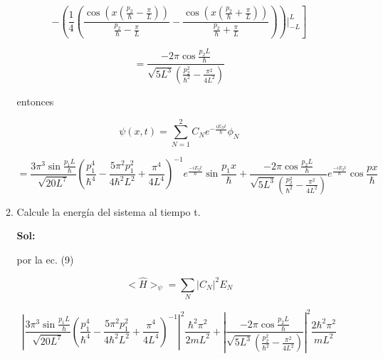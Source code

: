 \documentclass[12pt,a4paper]{article}
\begin{document}
\begin{enumerate}
\begin{enumerate}
        \begin{equation*}
            \left.- \left(\frac{1}{4} (\frac{\cos{(x(\frac{p_2}{\hbar}  - \frac{\pi}{L}) )}}{\frac{p_2}{\hbar}  - \frac{\pi}{L}} - \frac{\cos{(x(\frac{p_2}{\hbar}  + \frac{\pi}{L}))}}{\frac{p_2}{\hbar}  + \frac{\pi}{L}}) \right)|_{-L}^{L}\right]
        \end{equation*}
        
        \begin{equation*}
            =\frac{-2\pi\cos{\frac{p_2 L}{\hbar}}}{\sqrt{5L^3} \left(\frac{p_2^2}{\hbar^2} - \frac{\pi^2}{4L^2}\right)}
        \end{equation*}
        
        
        entonces
        
        \begin{equation*}
            \psi (x,t) = \sum_{N=1}^{2} C_N  e^{-\frac{iE_N t}{\hbar}} \phi_N 
        \end{equation*}
        
        \begin{equation*}
            = \frac{3 \pi^3 \sin{\frac{p_1 L}{\hbar}}}{\sqrt{20L^7}} (\frac{p_1^4}{\hbar^4} - \frac{5 \pi^2 p_1^2}{4 \hbar^2 L^2} + \frac{\pi^4}{4L^4})^{-1} e^{\frac{-iE_2 t}{\hbar}} \sin{\frac{p_1 x}{\hbar}} + \frac{-2\pi\cos{\frac{p_2 L}{\hbar}}}{\sqrt{5L^3} \left(\frac{p_2^2}{\hbar^2} - \frac{\pi^2}{4L^2}\right)} e^{\frac{-iE_2 t}{\hbar}} \cos{\frac{px}{\hbar}}
        \end{equation*}
        
        
        \item Calcule la energía del sistema al tiempo t.
        
        \textbf{Sol:}
        
        por la ec. (9)
        
        \begin{equation*}
            <\hat{H}>_\psi = \sum_N |C_N|^2 E_N
        \end{equation*}
        
        \begin{equation*}
            |\frac{3 \pi^3 \sin{\frac{p_1 L}{\hbar}}}{\sqrt{20L^7}} (\frac{p_1^4}{\hbar^4} - \frac{5 \pi^2 p_1^2}{4 \hbar^2 L^2} + \frac{\pi^4}{4L^4})^{-1}|^2 \frac{\hbar^2 \pi^2}{2mL^2} + |\frac{-2\pi\cos{\frac{p_2 L}{\hbar}}}{\sqrt{5L^3} \left(\frac{p_2^2}{\hbar^2} - \frac{\pi^2}{4L^2}\right)}|^2 \frac{2\hbar^2 \pi^2}{mL^2}
        \end{equation*}
        

\end{enumerate}
\end{enumerate}
\end{document}
